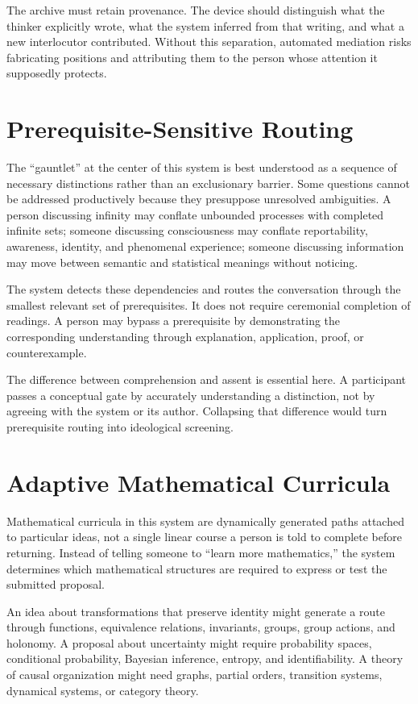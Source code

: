\documentclass[11pt]{article}
\begin{document}
The archive must retain provenance. The device should distinguish what the thinker explicitly wrote, what the system inferred from that writing, and what a new interlocutor contributed. Without this separation, automated mediation risks fabricating positions and attributing them to the person whose attention it supposedly protects.

\section{Prerequisite-Sensitive Routing}

The ``gauntlet'' at the center of this system is best understood as a sequence of necessary distinctions rather than an exclusionary barrier. Some questions cannot be addressed productively because they presuppose unresolved ambiguities. A person discussing infinity may conflate unbounded processes with completed infinite sets; someone discussing consciousness may conflate reportability, awareness, identity, and phenomenal experience; someone discussing information may move between semantic and statistical meanings without noticing.

The system detects these dependencies and routes the conversation through the smallest relevant set of prerequisites. It does not require ceremonial completion of readings. A person may bypass a prerequisite by demonstrating the corresponding understanding through explanation, application, proof, or counterexample.

The difference between comprehension and assent is essential here. A participant passes a conceptual gate by accurately understanding a distinction, not by agreeing with the system or its author. Collapsing that difference would turn prerequisite routing into ideological screening.

\section{Adaptive Mathematical Curricula}

Mathematical curricula in this system are dynamically generated paths attached to particular ideas, not a single linear course a person is told to complete before returning. Instead of telling someone to ``learn more mathematics,'' the system determines which mathematical structures are required to express or test the submitted proposal.

An idea about transformations that preserve identity might generate a route through functions, equivalence relations, invariants, groups, group actions, and holonomy. A proposal about uncertainty might require probability spaces, conditional probability, Bayesian inference, entropy, and identifiability. A theory of causal organization might need graphs, partial orders, transition systems, dynamical systems, or category theory.
\end{document}
